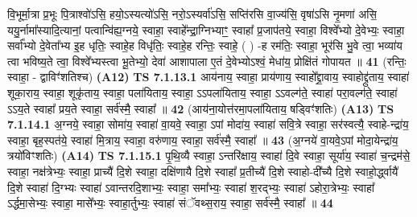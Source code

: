 \documentclass[17pt]{extarticle}
\begin{document}
                  वि॒भूर्मा॒त्रा प्र॒भूः पि॒त्राश्वो॑ऽसि॒ हयो॒ऽस्यत्यो॑ऽसि॒ नरो॒ऽस्यर्वा॑ऽसि॒ सप्ति॑रसि वा॒ज्य॑सि॒ वृषा॑ऽसि नृ॒मणा॑ असि॒ ययु॒र्नामा᳚स्यादि॒त्यानां॒ पत्वान्वि॑ह्य॒ग्नये॒ स्वाहा॒ स्वाहे᳚न्द्रा॒ग्निभ्याꣳ॒॒ स्वाहा᳚ प्र॒जाप॑तये॒ स्वाहा॒ विश्वे᳚भ्यो दे॒वेभ्यः॒ स्वाहा॒ सर्वा᳚भ्यो दे॒वेता᳚भ्य इ॒ह धृतिः॒ स्वाहे॒ह विधृ॑तिः॒ स्वाहे॒ह रन्तिः॒ स्वाहे॒ ( ) -ह रम॑तिः॒ स्वाहा॒ भूर॑सि भु॒वे त्वा॒ भव्या॑य त्वा भविष्य॒ते त्वा॒ विश्वे᳚भ्यस्त्वा भू॒तेभ्यो॒ देवा॑ आशापाला ए॒तं दे॒वेभ्योऽश्वं॒ मेधा॑य॒ प्रोक्षि॑तं गोपायत ॥ \textbf{  41} \newline
                  \newline
                      (रन्तिः॒ स्वाहा॒ - द्वाविꣳ॑शतिश्च)  \textbf{(A12)} \newline \newline
                                        \textbf{ TS 7.1.13.1} \newline
                  आय॑नाय॒ स्वाहा॒ प्राय॑णाय॒ स्वाहो᳚द्द्रा॒वाय॒ स्वाहोद्द्रु॑ताय॒ स्वाहा॑ शूका॒राय॒ स्वाहा॒ शूकृ॑ताय॒ स्वाहा॒ पला॑यिताय॒ स्वाहा॒ ऽऽपला॑यिताय॒ स्वाहा॒ ऽऽवल्ग॑ते॒ स्वाहा॑ परा॒वल्ग॑ते॒ स्वाहा॑ ऽऽय॒ते स्वाहा᳚ प्रय॒ते स्वाहा॒ सर्व॑स्मै॒ स्वाहा᳚ ॥ \textbf{  42} \newline
                  \newline
                      (आय॑ना॒योत्त॑रमा॒पला॑यिताय॒ षड्विꣳ॑शतिः)  \textbf{(A13)} \newline \newline
                                        \textbf{ TS 7.1.14.1} \newline
                  अ॒ग्नये॒ स्वाहा॒ सोमा॑य॒ स्वाहा॑ वा॒यवे॒ स्वाहा॒ ऽपां मोदा॑य॒ स्वाहा॑ सवि॒त्रे स्वाहा॒ सर॑स्वत्यै॒ स्वाहे-न्द्रा॑य॒ स्वाहा॒ बृह॒स्पत॑ये॒ स्वाहा॑ मि॒त्राय॒ स्वाहा॒ वरु॑णाय॒ स्वाहा॒ सर्व॑स्मै॒ स्वाहा᳚ ॥ \textbf{  43} \newline
                  \newline
                      (अ॒ग्नये॑ वा॒यवे॒ऽपां मोदा॒येन्द्रा॑य॒ त्रयो॑विꣳशतिः)  \textbf{(A14)} \newline \newline
                                        \textbf{ TS 7.1.15.1} \newline
                  पृ॒थि॒व्यै स्वाहा॒ ऽन्तरि॑क्षाय॒ स्वाहा॑ दि॒वे स्वाहा॒ सूर्या॑य॒ स्वाहा॑ च॒न्द्रम॑से॒ स्वाहा॒ नक्ष॑त्रेभ्यः॒ स्वाहा॒ प्राच्यै॑ दि॒शे स्वाहा॒ दक्षि॑णायै दि॒शे स्वाहा᳚ प्र॒तीच्यै॑ दि॒शे स्वाहो-दी᳚च्यै दि॒शे स्वाहो॒र्द्ध्वायै॑ दि॒शे स्वाहा॑ दि॒ग्भ्यः स्वाहा॑ ऽवान्तरदि॒शाभ्यः॒ स्वाहा॒ समा᳚भ्यः॒ स्वाहा॑ श॒रद्भ्यः॒ स्वाहा॑ ऽहोरा॒त्रेभ्यः॒ स्वाहा᳚ ऽर्द्धमा॒सेभ्यः॒ स्वाहा॒ मासे᳚भ्यः॒ स्वाहा॒र्तुभ्यः॒ स्वाहा॑ संॅवथ्स॒राय॒ स्वाहा॒ सर्व॑स्मै॒ स्वाहा᳚ ॥ \textbf{  44} \newline
\end{document}
